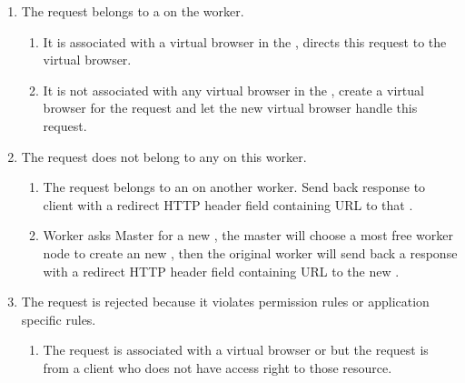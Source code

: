 \begin{enumerate}
    \item The request belongs to a \appins{} on the worker.
    \begin{enumerate}
        \item It is associated with a virtual browser in the \appins{}, directs this request to the virtual browser.
        \item It is not associated with any virtual browser in the \appins{}, create a virtual browser for the request
        and let the new virtual browser handle this request.
    \end{enumerate}

    \item The request does not belong to any \appins{} on this worker.
    \begin{enumerate}
        \item The request belongs to an \appins{} on another worker. 
        Send back response to client with a redirect HTTP header field
        containing URL to that \appins{}.
        \item Worker asks Master for a new \appins{}, 
        the master will choose a most free worker node to create an new \appins{},
        then the original worker will send back a response with a redirect HTTP header field
        containing URL to the new \appins{}.
    \end{enumerate}

    \item The request is rejected because it violates permission rules or application specific rules.
    \begin{enumerate}
        \item The request is associated with a virtual browser or \appins{} but 
        the request is from a client who does not have access right to those resource.
    \end{enumerate}    
\end{enumerate} 


